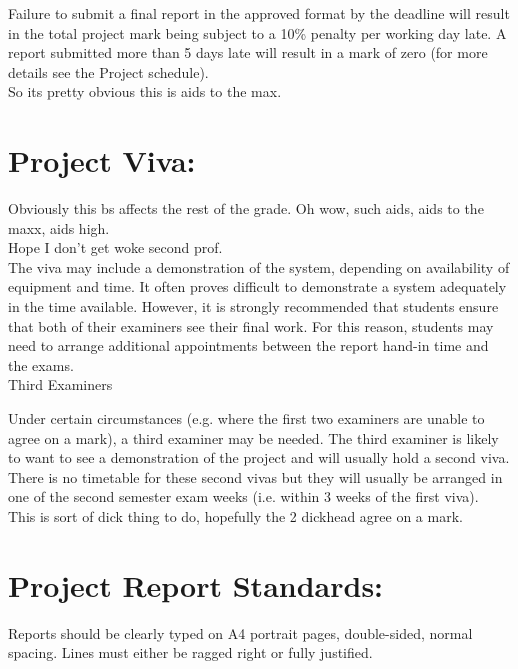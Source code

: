 \documentclass [12pt]{article}
\begin{document}
Failure to submit a final report in the approved format by the deadline will result in the total project mark being subject to a 10\% penalty per working day late. A report submitted more than 5 days late will result in a mark of zero (for more details see the Project schedule). \\

So its pretty obvious this is aids to the max.\\ 

\section{Project Viva:}

Obviously this bs affects the rest of the grade. Oh wow, such aids, aids to the maxx, aids high.\\

Hope I don't get woke second prof.\\ 


The viva may include a demonstration of the system, depending on availability of equipment and time. It often proves difficult to demonstrate a system adequately in the time available. However, it is strongly recommended that students ensure that both of their examiners see their final work. For this reason, students may need to arrange additional appointments between the report hand-in time and the exams.\\ 

Third Examiners

Under certain circumstances (e.g. where the first two examiners are unable to agree on a mark), a third examiner may be needed. The third examiner is likely to want to see a demonstration of the project and will usually hold a second viva. There is no timetable for these second vivas but they will usually be arranged in one of the second semester exam weeks (i.e. within 3 weeks of the first viva). \\

This is sort of dick thing to do, hopefully the 2 dickhead agree on a mark.\\ 

\section{Project Report Standards:}

Reports should be clearly typed on A4 portrait pages, double-sided, normal spacing. Lines must either be ragged right or fully justified.
\end{document}
